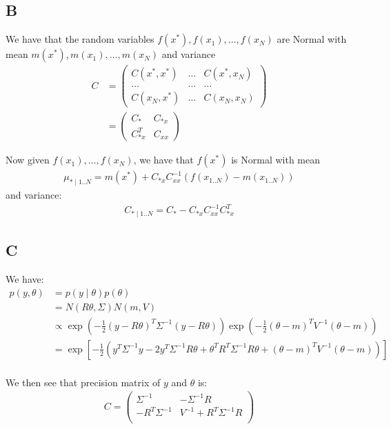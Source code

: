 \documentclass{article}
\begin{document}
\subsection*{B}
We have that the random variables \(f(x^*), f(x_1), \ldots, f(x_N)\) are Normal with mean \( m(x^*), m(x_1), \ldots, m(x_N)\) and variance
\begin{align*}
C &= \begin{pmatrix}
C(x^*, x^*) & \ldots & C(x^*, x_N)\\
\ldots      & \ldots & \ldots\\
C(x_N, x^*) & \ldots & C(x_N, x_N)
\end{pmatrix}\\
&= \begin{pmatrix}
C_* & C_{*x}\\
C_{*x}^T & C_{xx}
\end{pmatrix}
\end{align*}

Now given \( f(x_1), \ldots, f(x_N)\), we have that \(f(x^*)\) is Normal with mean \begin{align*}
\mu_{* \mid 1..N} =  m(x^*) + C_{*x} C_{xx}^{-1} ( f(x_{1..N}) - m(x_{1..N}))
\end{align*}
and variance:
\begin{align*}
C_{* \mid 1..N} = C_{*} - C_{*x} C_{xx}^{-1} C_{*x}^T
\end{align*}

\subsection*{C}
We have:
\begin{align*}
p(y, \theta) &= p(y \mid \theta) p(\theta)\\
&= N(R\theta, \Sigma) N(m, V)\\
&\propto \exp\left( -\frac{1}{2} (y - R\theta)^T \Sigma^{-1} (y - R\theta) \right) \exp\left( -\frac{1}{2} (\theta - m)^T V^{-1} (\theta - m) \right)\\
& = \exp\left[ -\frac{1}{2} \left( y^T\Sigma^{-1}y - 2y^T\Sigma^{-1}R\theta + \theta^TR^T\Sigma^{-1} R\theta  + (\theta - m)^T V^{-1} (\theta - m) \right) \right]\\
\end{align*}

We then see that precision matrix of \(y\) and \(\theta\) is:
\begin{align*}
C = \begin{pmatrix}
\Sigma^{-1} & -\Sigma^{-1}R \\
-R^T \Sigma^{-1} & V^{-1} + R^T\Sigma^{-1} R\\
\end{pmatrix}
\end{align*}
\end{document}

